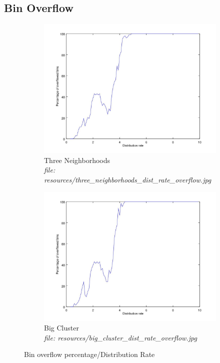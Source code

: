 \documentclass{article}
\begin{document}
		\subsection{Bin Overflow}
		\begin{figure}[H]
			\centering
			\begin{subfigure}[b]{.5\textwidth}
				\includegraphics[width=\textwidth]{resources/three_neighborhoods_dist_rate_overflow.jpg}
				\caption{Three Neighborhoods \\\textit{file: resources/three\_neighborhoods\_dist\_rate\_overflow.jpg}}
				\label{fig:fig8a}
			\end{subfigure}\hfill%
			\begin{subfigure}[b]{.5\textwidth}
				\includegraphics[width=\textwidth]{resources/big_cluster_dist_rate_overflow.jpg}
				\caption{Big Cluster\\\textit{file: resources/big\_cluster\_dist\_rate\_overflow.jpg}}
				\label{fig:fig8b}
			\end{subfigure}
			\label{fig:fig8}
			\caption{Bin overflow percentage/Distribution Rate}
		\end{figure}
\end{document}
